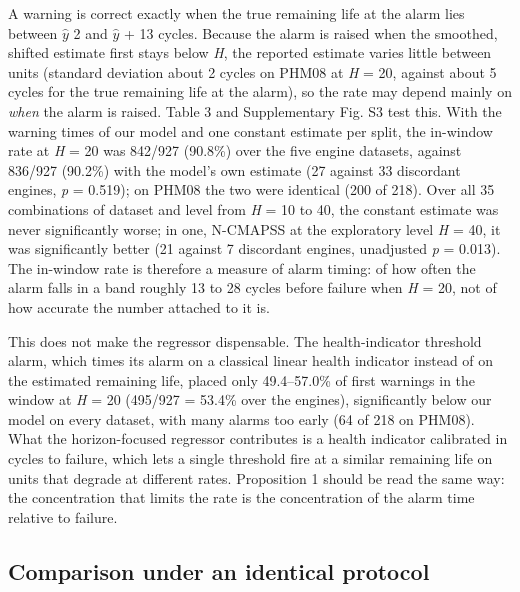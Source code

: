 \documentclass[a4paper,fleqn,doubleblind]{cas-dc}
\begin{document}
A warning is correct exactly when the true remaining life at the alarm lies between $\hat{y}$ \textminus{} 2 and $\hat{y}$ + 13 cycles. Because the alarm is raised when the smoothed, shifted estimate first stays below \textit{H}, the reported estimate varies little between units (standard deviation about 2 cycles on PHM08 at \textit{H} = 20, against about 5 cycles for the true remaining life at the alarm), so the rate may depend mainly on \textit{when} the alarm is raised. Table 3 and Supplementary Fig. S3 test this. With the warning times of our model and one constant estimate per split, the in-window rate at \textit{H} = 20 was 842/927 (90.8\%) over the five engine datasets, against 836/927 (90.2\%) with the model's own estimate (27 against 33 discordant engines, \textit{p} = 0.519); on PHM08 the two were identical (200 of 218). Over all 35 combinations of dataset and level from \textit{H} = 10 to 40, the constant estimate was never significantly worse; in one, N-CMAPSS at the exploratory level \textit{H} = 40, it was significantly better (21 against 7 discordant engines, unadjusted \textit{p} = 0.013). The in-window rate is therefore a measure of alarm timing: of how often the alarm falls in a band roughly 13 to 28 cycles before failure when \textit{H} = 20, not of how accurate the number attached to it is.

This does not make the regressor dispensable. The health-indicator threshold alarm, which times its alarm on a classical linear health indicator instead of on the estimated remaining life, placed only 49.4--57.0\% of first warnings in the window at \textit{H} = 20 (495/927 = 53.4\% over the engines), significantly below our model on every dataset, with many alarms too early (64 of 218 on PHM08). What the horizon-focused regressor contributes is a health indicator calibrated in cycles to failure, which lets a single threshold fire at a similar remaining life on units that degrade at different rates. Proposition 1 should be read the same way: the concentration that limits the rate is the concentration of the alarm time relative to failure.

\subsection{Comparison under an identical protocol}
\end{document}
